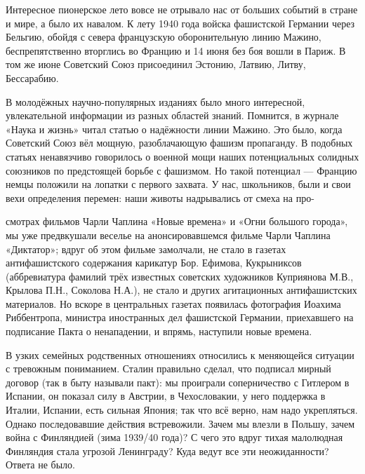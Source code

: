 Интересное пионерское лето вовсе не отрывало нас от больших событий в стране и мире, а было их навалом. К лету 1940 года войска фашистской Германии через Бельгию, обойдя с севера французскую оборонительную линию Мажино, беспрепятственно вторглись во Францию и 14 июня без боя вошли в Париж. В том же июне Советский Союз присоединил Эстонию, Латвию, Литву, Бессарабию.

В молодёжных научно-популярных изданиях было много интересной, увлекательной информации из разных областей знаний. Помнится, в журнале «Наука и жизнь» читал статью о надёжности линии Мажино. Это было, когда Советский Союз вёл мощную, разоблачающую фашизм пропаганду. В подобных статьях ненавязчиво говорилось о военной мощи наших потенциальных солидных союзников по предстоящей борьбе с фашизмом. Но такой потенциал — Францию немцы положили на лопатки с первого захвата. У нас, школьников, были и свои вехи определения перемен: наши животы надрывались от смеха на про-

смотрах фильмов Чарли Чаплина «Новые времена» и «Огни большого города», мы уже предвкушали веселье на анонсировавшемся фильме Чарли Чаплина «Диктатор»; вдруг об этом фильме замолчали, не стало в газетах антифашистского содержания карикатур Бор. Ефимова, Кукрыниксов (аббревиатура фамилий трёх известных советских художников Куприянова М.В., Крылова П.Н., Соколова Н.А.), не стало и других агитационных антифашистских материалов. Но вскоре в центральных газетах появилась фотография Иоахима Риббентропа, министра иностранных дел фашистской Германии, приехавшего на подписание Пакта о ненападении, и впрямь, наступили новые времена.

В узких семейных родственных отношениях относились к меняющейся ситуации с тревожным пониманием. Сталин правильно сделал, что подписал мирный договор (так в быту называли пакт): мы проиграли соперничество с Гитлером в Испании, он показал силу в Австрии, в Чехословакии, у него поддержка в Италии, Испании, есть сильная Япония; так что всё верно, нам надо укрепляться. Однако последовавшие действия встревожили. Зачем мы влезли в Польшу, зачем война с Финляндией (зима 1939/40 года)? С чего это вдруг тихая малолюдная Финляндия стала угрозой Ленинграду? Куда ведут все эти неожиданности? Ответа не было.

